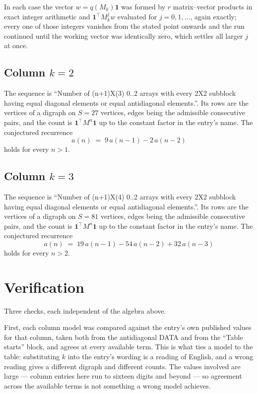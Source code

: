 \documentclass[11pt,a4paper]{article}
\theoremstyle{plain}
\theoremstyle{definition}
\begin{document}
In each case the vector $w=q(M_k)\mathbf{1}$ was formed by $r$ matrix--vector products in
exact integer arithmetic and $\mathbf{1}^{\!\top}M_k^{j}w$ evaluated for $j=0,1,\dots$,
again exactly; every one of those integers vanishes from the stated point onwards and the run
continued until the working vector was identically zero, which settles all larger $j$ at once.

\subsection*{Column $k=2$}
The sequence is ``Number of (n+1)X(3) 0..2 arrays with every 2X2 subblock having equal diagonal elements or equal antidiagonal elements.''. Its rows are the vertices of a digraph on
$S=27$ vertices, edges being the admissible consecutive pairs, and the count is
$\mathbf{1}^{\!\top}M^{n}\mathbf{1}$ up to the constant factor in the entry's name.
The conjectured recurrence
\[
a(n)\;=\;9\,a(n-1) - 2\,a(n-2)
\]
holds for every $n>1$.

\subsection*{Column $k=3$}
The sequence is ``Number of (n+1)X(4) 0..2 arrays with every 2X2 subblock having equal diagonal elements or equal antidiagonal elements.''. Its rows are the vertices of a digraph on
$S=81$ vertices, edges being the admissible consecutive pairs, and the count is
$\mathbf{1}^{\!\top}M^{n}\mathbf{1}$ up to the constant factor in the entry's name.
The conjectured recurrence
\[
a(n)\;=\;19\,a(n-1) - 54\,a(n-2) + 32\,a(n-3)
\]
holds for every $n>2$.

\section{Verification}

Three checks, each independent of the algebra above.

First, each column model was compared against the entry's own published values for that
column, taken both from the antidiagonal DATA and from the ``Table starts'' block, and agrees
at every available term. This is what ties a model to the table: substituting $k$ into the
entry's wording is a reading of English, and a wrong reading gives a different digraph and
different counts. The values involved are large --- column entries here run to sixteen digits
and beyond --- so agreement across the available terms is not something a wrong model
achieves.
\end{document}

